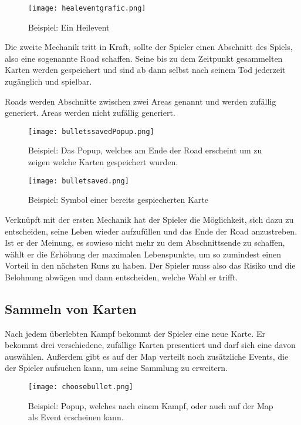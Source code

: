 \begin{figure}[H]
\texttt{[image: healeventgrafic.png]}
\caption{Beispiel: Ein Heilevent}
\end{figure}


Die zweite Mechanik tritt in Kraft, sollte der Spieler  einen Abschnitt des Spiels, also eine sogenannte Road schaffen. Seine bis zu dem Zeitpunkt gesammelten Karten werden
gespeichert und sind ab dann selbst nach seinem Tod jederzeit zugänglich und spielbar.


Roads werden Abschnitte zwischen zwei Areas genannt und werden zufällig generiert. Areas werden nicht zufällig generiert.

\begin{figure}[H]
    \texttt{[image: bulletssavedPopup.png]}
    \caption{Beispiel: Das Popup, welches am Ende der Road erscheint um zu zeigen welche Karten gespeichert wurden.}
\end{figure}


\begin{figure}[H]
    \texttt{[image: bulletsaved.png]}
    \caption{Beispiel: Symbol einer bereits gespiecherten Karte}
\end{figure}

Verknüpft mit der ersten Mechanik
hat der Spieler die Möglichkeit, sich dazu zu entscheiden, seine Leben wieder aufzufüllen und das Ende der Road anzustreben.
Ist er der Meinung, es sowieso nicht mehr zu dem Abschnittsende zu schaffen, wählt er die Erhöhung der maximalen
Lebenspunkte, um so zumindest einen Vorteil in den nächsten Runs zu haben. Der Spieler muss also das Risiko und die
Belohnung abwägen und dann entscheiden, welche Wahl er trifft.



\subsection{Sammeln von Karten}\label{sammeln_der_Karten}

Nach jedem überlebten Kampf bekommt der Spieler eine neue Karte. Er bekommt drei verschiedene, zufällige Karten presentiert und darf sich eine davon auswählen.
Außerdem gibt es auf der Map verteilt noch zusätzliche Events, die der Spieler aufsuchen kann, um seine Sammlung zu erweitern.

\begin{figure}[H]
    \texttt{[image: choosebullet.png]}
    \caption{Beispiel: Popup, welches nach einem Kampf, oder auch auf der Map als Event erscheinen kann.}
\end{figure}

